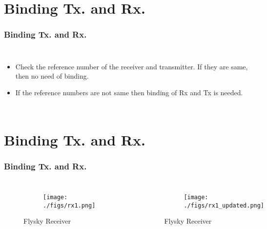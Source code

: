 \documentclass{beamer}
\begin{document}
\section{Binding Tx. and Rx.}
\begin{frame}
\frametitle{Binding Tx. and Rx.}
\begin{columns}

  \begin{itemize}
  \item  Check the reference number of the receiver and transmitter. If they are same, then no need of binding.
  \vspace{10pt}
  \item If the reference numbers are not same then binding of Rx and Tx is needed.
  
  
  \end{itemize}
\end{columns}



\end{frame}

\section{Binding Tx. and Rx.}
\begin{frame}
\frametitle{Binding Tx. and Rx.}
\begin{columns}
\begin{figure}[h!]
  \centering
  \begin{subfigure}[b]{0.75\linewidth}
    \texttt{[image: ./figs/rx1.png]}
  \end{subfigure}

  \caption{Flysky Receiver}
\end{figure}

\begin{figure}[h!]
  \centering
  \begin{subfigure}[b]{0.75\linewidth}
    \texttt{[image: ./figs/rx1\_updated.png]}
  \end{subfigure}

  \caption{Flysky Receiver}
\end{figure}
  
\end{columns}



\end{frame}
\end{document}
